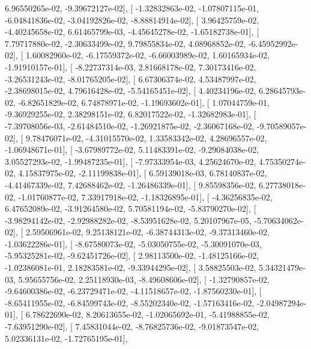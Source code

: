 \documentclass{article}
\begin{document}
          6.96550265e-02,  -9.39672127e-02],
       [ -1.32832863e-02,  -1.07807115e-01,  -6.04841836e-02,
         -3.04192826e-02,  -8.88814914e-02],
       [  3.96425759e-02,  -4.40245658e-02,   6.61465799e-03,
         -4.45645278e-02,  -1.65182738e-01],
       [  7.79717880e-02,  -2.30633499e-02,   9.79855834e-02,
          4.08968852e-02,  -6.45952992e-02],
       [  1.60082960e-02,  -6.17559372e-02,  -6.66003989e-02,
          1.60165934e-02,  -1.91910157e-01],
       [ -8.22737314e-03,   2.81668178e-02,   7.30173416e-02,
         -3.26531243e-02,  -8.01765205e-02],
       [  6.67306374e-02,   4.53487997e-02,  -2.38698015e-02,
          4.79616428e-02,  -5.54165451e-02],
       [  4.40234196e-02,   6.28645793e-02,  -6.82651829e-02,
          6.74878971e-02,  -1.19693602e-01],
       [  1.07044759e-01,  -9.36929255e-02,   2.38298151e-02,
          6.82017522e-02,  -1.32682983e-01],
       [ -7.39708056e-03,  -2.61484510e-02,  -1.26921875e-02,
         -2.36067168e-02,  -9.70589057e-02],
       [  9.78476071e-02,  -4.31015570e-02,   1.33583342e-02,
          4.28696557e-02,  -1.06948671e-01],
       [ -3.67989772e-02,   5.11483391e-02,  -9.29084038e-02,
          3.05527293e-02,  -1.99487235e-01],
       [ -7.97333954e-03,   4.25624670e-02,   4.75350274e-02,
          4.15837975e-02,  -2.11199838e-01],
       [  6.59139018e-03,   6.78140837e-02,  -4.41467339e-02,
          7.42688462e-02,  -1.26486339e-01],
       [  9.85598356e-02,   6.27738018e-02,  -1.01760877e-02,
          7.33917918e-02,  -1.18326895e-01],
       [ -4.36256835e-02,   6.47652089e-02,  -3.91264580e-02,
          5.70581194e-02,  -5.83790270e-02],
       [ -3.98294142e-02,  -2.92988282e-02,  -8.53951628e-02,
          5.20107967e-05,  -5.70634062e-02],
       [  2.59506961e-02,   9.25138121e-02,  -6.38744313e-02,
         -9.37313460e-02,  -1.03622286e-01],
       [ -8.67580073e-02,  -5.03050755e-02,  -5.30091070e-03,
         -5.95325281e-02,  -9.62451726e-02],
       [  2.98113500e-02,  -1.48125166e-02,  -1.02386081e-01,
          2.18283581e-02,  -9.33944295e-02],
       [  3.58825503e-02,   5.34321479e-03,   5.95655756e-02,
          2.25118930e-03,  -8.49608606e-02],
       [ -1.32790857e-02,  -9.64600386e-02,  -6.23729471e-02,
         -4.11518657e-02,  -1.87560230e-01],
       [ -8.65411955e-02,  -6.84599743e-02,  -8.55202340e-02,
         -1.57163416e-02,  -2.04987294e-01],
       [  6.78622690e-02,   8.20613655e-02,  -1.02065692e-01,
         -5.41988855e-02,  -7.63951290e-02],
       [  7.45831044e-02,  -8.76825736e-02,  -9.01873547e-02,
          5.02336131e-02,  -1.72765195e-01],
\end{document}
